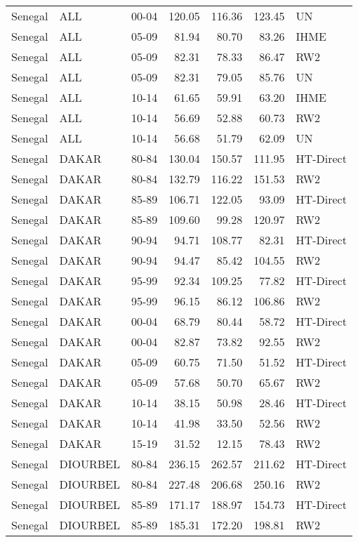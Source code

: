 \begin{longtable}{lllrrrl}
  Senegal & ALL & 00-04 & 120.05 & 116.36 & 123.45 & UN \\ 
  Senegal & ALL & 05-09 & 81.94 & 80.70 & 83.26 & IHME \\ 
  Senegal & ALL & 05-09 & 82.31 & 78.33 & 86.47 & RW2 \\ 
  Senegal & ALL & 05-09 & 82.31 & 79.05 & 85.76 & UN \\ 
  Senegal & ALL & 10-14 & 61.65 & 59.91 & 63.20 & IHME \\ 
  Senegal & ALL & 10-14 & 56.69 & 52.88 & 60.73 & RW2 \\ 
  Senegal & ALL & 10-14 & 56.68 & 51.79 & 62.09 & UN \\ 
  Senegal & DAKAR & 80-84 & 130.04 & 150.57 & 111.95 & HT-Direct \\ 
  Senegal & DAKAR & 80-84 & 132.79 & 116.22 & 151.53 & RW2 \\ 
  Senegal & DAKAR & 85-89 & 106.71 & 122.05 & 93.09 & HT-Direct \\ 
  Senegal & DAKAR & 85-89 & 109.60 & 99.28 & 120.97 & RW2 \\ 
  Senegal & DAKAR & 90-94 & 94.71 & 108.77 & 82.31 & HT-Direct \\ 
  Senegal & DAKAR & 90-94 & 94.47 & 85.42 & 104.55 & RW2 \\ 
  Senegal & DAKAR & 95-99 & 92.34 & 109.25 & 77.82 & HT-Direct \\ 
  Senegal & DAKAR & 95-99 & 96.15 & 86.12 & 106.86 & RW2 \\ 
  Senegal & DAKAR & 00-04 & 68.79 & 80.44 & 58.72 & HT-Direct \\ 
  Senegal & DAKAR & 00-04 & 82.87 & 73.82 & 92.55 & RW2 \\ 
  Senegal & DAKAR & 05-09 & 60.75 & 71.50 & 51.52 & HT-Direct \\ 
  Senegal & DAKAR & 05-09 & 57.68 & 50.70 & 65.67 & RW2 \\ 
  Senegal & DAKAR & 10-14 & 38.15 & 50.98 & 28.46 & HT-Direct \\ 
  Senegal & DAKAR & 10-14 & 41.98 & 33.50 & 52.56 & RW2 \\ 
  Senegal & DAKAR & 15-19 & 31.52 & 12.15 & 78.43 & RW2 \\ 
  Senegal & DIOURBEL & 80-84 & 236.15 & 262.57 & 211.62 & HT-Direct \\ 
  Senegal & DIOURBEL & 80-84 & 227.48 & 206.68 & 250.16 & RW2 \\ 
  Senegal & DIOURBEL & 85-89 & 171.17 & 188.97 & 154.73 & HT-Direct \\ 
  Senegal & DIOURBEL & 85-89 & 185.31 & 172.20 & 198.81 & RW2 \\ 

\end{longtable}
